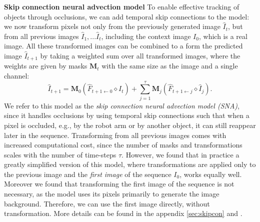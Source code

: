 \noindent \textbf{Skip connection neural advection model}
To enable effective tracking of objects through occlusions, we can add temporal skip connections to the model: we now transform pixels not only from the previously generated image $\hat{I}_t$, but from all previous images $\hat{I}_1,...\hat{I}_{t}$, including the context image $I_0$, which is a real image. All these transformed images can be combined to a form the predicted image $\hat{I}_{t+1}$ by taking a weighted sum over all transformed images, where the weights are given by masks $\mathbf{M}_t$ with the same size as the image and a single channel:
\begin{equation}
\hat{I}_{t+1} =  \mathbf{M}_{0} (\hat{F}_{t+1 \leftarrow 0} \diamond I_t) +  \sum_{j=1}^{\tau} \mathbf{M}_{j} (\hat{F}_{t+1 \leftarrow j} \diamond  \hat{I}_j).
\end{equation}
We refer to this model as the \emph{skip connection neural advection model (SNA)}, since it handles occlusions by using temporal skip connections such that when a pixel is occluded, e.g., by the robot arm or by another object, it can still reappear later in the sequence.
Transforming from all previous images comes with increased computational cost, since the number of masks and transformations scales with the number of time-steps $\tau$. However, we found that in practice a greatly simplified version of this model, where transformations are applied only to the previous image and the \emph{first image} of the sequence $I_0$, works equally well. Moreover we found that transforming the first image of the sequence is not necessary, as the model uses its pixels primarily to generate the image background. Therefore, we can use the first image directly, without transformation. More details can be found in the appendix \ref{sec:skipcon} and \cite{sna}.